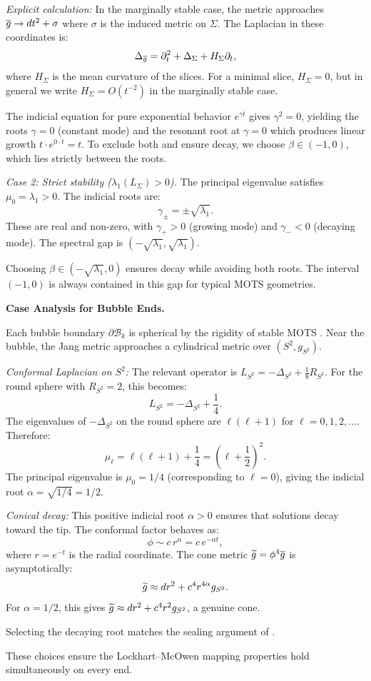 \begin{lemma}
\textit{Explicit calculation:} In the marginally stable case, the metric approaches $\overline{g} \to dt^2 + \sigma$ where $\sigma$ is the induced metric on $\Sigma$. The Laplacian in these coordinates is:
\[
    \Delta_{\overline{g}} = \partial_t^2 + \Delta_\Sigma + H_\Sigma \partial_t,
\]
where $H_\Sigma$ is the mean curvature of the slices. For a minimal slice, $H_\Sigma = 0$, but in general we write $H_\Sigma = O(t^{-2})$ in the marginally stable case.

The indicial equation for pure exponential behavior $e^{\gamma t}$ gives $\gamma^2 = 0$, yielding the roots $\gamma = 0$ (constant mode) and the resonant root at $\gamma = 0$ which produces linear growth $t \cdot e^{0 \cdot t} = t$. To exclude both and ensure decay, we choose $\beta \in (-1, 0)$, which lies strictly between the roots.

\textit{Case 2: Strict stability ($\lambda_1(L_\Sigma) > 0$).}
The principal eigenvalue satisfies $\mu_0 = \lambda_1 > 0$. The indicial roots are:
\[
    \gamma_\pm = \pm \sqrt{\lambda_1}.
\]
These are real and non-zero, with $\gamma_+ > 0$ (growing mode) and $\gamma_- < 0$ (decaying mode). The spectral gap is $(-\sqrt{\lambda_1}, \sqrt{\lambda_1})$.

Choosing $\beta \in (-\sqrt{\lambda_1}, 0)$ ensures decay while avoiding both roots. The interval $(-1, 0)$ is always contained in this gap for typical MOTS geometries.

\textbf{Case Analysis for Bubble Ends.}

Each bubble boundary $\partial \mathcal{B}_k$ is spherical by the rigidity of stable MOTS \cite{gallowayschoen2006}. Near the bubble, the Jang metric approaches a cylindrical metric over $(S^2, g_{S^2})$.

\textit{Conformal Laplacian on $S^2$:}
The relevant operator is $L_{S^2} = -\Delta_{S^2} + \frac{1}{8}R_{S^2}$. For the round sphere with $R_{S^2} = 2$, this becomes:
\[
    L_{S^2} = -\Delta_{S^2} + \frac{1}{4}.
\]
The eigenvalues of $-\Delta_{S^2}$ on the round sphere are $\ell(\ell+1)$ for $\ell = 0, 1, 2, \ldots$. Therefore:
\[
    \mu_\ell = \ell(\ell+1) + \frac{1}{4} = \left(\ell + \frac{1}{2}\right)^2.
\]
The principal eigenvalue is $\mu_0 = 1/4$ (corresponding to $\ell=0$), giving the indicial root $\alpha = \sqrt{1/4} = 1/2$.

\textit{Conical decay:}
This positive indicial root $\alpha > 0$ ensures that solutions decay toward the tip. The conformal factor behaves as:
\[
    \phi \sim c \, r^\alpha = c \, e^{-\alpha t},
\]
where $r = e^{-t}$ is the radial coordinate. The cone metric $\widetilde{g} = \phi^4 \overline{g}$ is asymptotically:
\[
    \widetilde{g} \approx dr^2 + c^4 r^{4\alpha} g_{S^2}.
\]
For $\alpha = 1/2$, this gives $\widetilde{g} \approx dr^2 + c^4 r^2 g_{S^2}$, a genuine cone.

Selecting the decaying root matches the sealing argument of .

These choices ensure the Lockhart--McOwen mapping properties hold simultaneously on every end.
\end{lemma}

